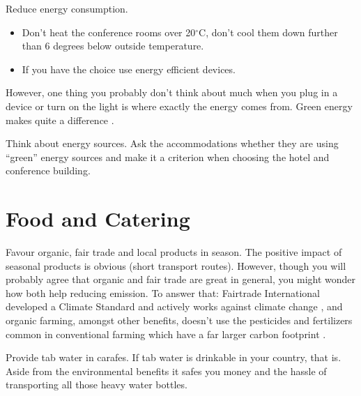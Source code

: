 \begin{suggest}{Reduce energy consumption.}
	\vspace{-2\topsep}
	\begin{itemize}
		\item Don't heat the conference rooms over 20$^\circ$C, don't cool them down further than 6 degrees below outside temperature.
		\item If you have the choice use energy efficient devices.
	\end{itemize}	
\end{suggest}

However, one thing you probably don't think about much when you plug in a device or turn on the light is where exactly the energy comes from. Green energy makes quite a difference \cite{energy}.

\begin{suggest}{Think about energy sources.}
	Ask the accommodations whether they are using ``green'' energy sources and make it a criterion when choosing the hotel and conference building.
\end{suggest}

\section{Food and Catering}

\begin{suggest}{Favour organic, fair trade and local products in season.}
	The positive impact of seasonal products is obvious (short transport routes). However, though you will probably agree that organic and fair trade are great in general, you might wonder how both help reducing emission. To answer that: Fairtrade International developed a Climate Standard and actively works against climate change \cite{fairtrade}, and organic farming, amongst other benefits, doesn't use the pesticides and fertilizers common in conventional farming which have a far larger carbon footprint \cite{organic}.
\end{suggest}

\begin{suggest}{Provide tab water in carafes.}
	If tab water is drinkable in your country, that is. Aside from the environmental benefits it safes you money and the hassle of transporting all those heavy water bottles.
\end{suggest}

